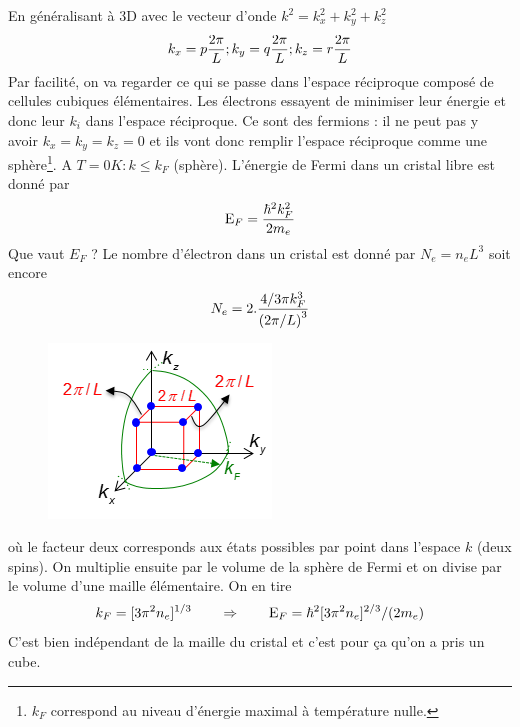 	En généralisant à 3D avec le vecteur d'onde ${k^2} = k_x^2 + k_y^2 + k_z^2$
	\begin{equation}
	{k_x} = p\frac{{2\pi }}{L};{\rm{  }}{k_y} = q\frac{{2\pi }}{L};{\rm{  }}{k_z} = r\frac{{2\pi }}{L}
	\end{equation}
	Par facilité, on va regarder ce qui se passe dans l'espace réciproque composé de cellules 
	cubiques élémentaires. Les électrons essayent de minimiser leur énergie et donc leur $k_i$ 
	dans l'espace réciproque. Ce sont des fermions : il ne peut pas y avoir $k_x=k_y=k_z=0$ et 
	ils vont donc remplir l'espace réciproque comme une sphère\footnote{$k_F$ correspond au 
	niveau d'énergie maximal à température nulle.}. A $T=0K : k\leq k_F$ (sphère).
	L'énergie de Fermi dans un cristal libre est donné par
	\begin{equation}
	{{\rm{E}}_F} = \frac{{{\hbar ^2}k_F^2}}{{2{m_e}}}
	\end{equation}
	Que vaut $E_F$ ? Le nombre d'électron dans un cristal est donné par ${N_e} = {n_e}{L^3}$ soit 
	encore
	\begin{equation}
	{N_e} = 2.\frac{{{4 \mathord{\left/
	 {\vphantom {4 3}} \right.
	 \kern-\nulldelimiterspace} 3}\pi k_F^3}}{{{{(2\pi /L)}^3}}}
	\end{equation}
	\begin{figure}
	\vspace{-5mm}
	\includegraphics[scale=0.6]{ch5/image2}
	\end{figure}
	où le facteur deux corresponds aux états possibles par point dans l'espace $k$ (deux spins). 
	On multiplie ensuite par le volume de la sphère de Fermi et on divise par le volume d'une 
	maille élémentaire. On en tire
	\begin{equation}
	{k_F} = {[3{\pi ^2}{n_e}]^{1/3}}\qquad\Rightarrow\qquad {{\rm{E}}_F} = {\hbar ^2}{[3{\pi ^2}{n_e}]^{2/3}}/(2{m_e})
	\end{equation}	
	C'est bien indépendant de la maille du cristal et c'est pour ça qu'on a pris un cube. 
	
